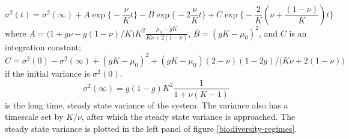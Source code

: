 \begin{equation}
 \sigma^2(t) = \sigma^2(\infty) + A\exp\Bigg\{-\frac{\nu}{K}t\Bigg\} - B\exp\Bigg\{-2\frac{\nu}{K}t\Bigg\} + C\exp\Bigg\{-\frac{2}{K}\left(\nu+\frac{(1-\nu)}{K}\right)t\Bigg\}
\end{equation}
where $A=\big(1+g\nu-g(1-\nu)/K\big)K^2\frac{\mu_0-gK}{K\nu+2(1-\nu)}$, $B=(gK-\mu_0)^2$, and $C$ is an integration constant; $C = \sigma^2(0) - \sigma^2(\infty) + (gK-\mu_0)^2 + (gK-\mu_0)(2-\nu)(1-2g)/\big(K\nu+2(1-\nu)\big)$ if the initial variance is $\sigma^2(0)$. 
\begin{equation}
\sigma^2(\infty) = g(1-g) K^2\frac{1}{1+\nu(K-1)}
\end{equation}
is the long time, steady state variance of the system. 
The variance also has a timescale set by $K/\nu$, after which the steady state variance is approached. 
The steady state variance is plotted in the left panel of figure \ref{biodiversity-regimes}. 


